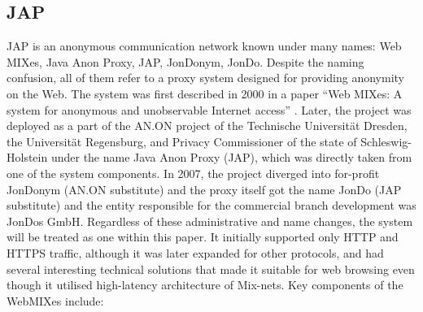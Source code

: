 \subsection{JAP}
JAP is an anonymous communication network known under many names: Web MIXes, Java Anon Proxy, JAP, JonDonym, JonDo. Despite the naming confusion, all of them refer to a proxy system designed for providing anonymity on the Web. The system was first described in 2000 in a paper “Web MIXes: A system for anonymous and unobservable Internet access” \cite{web-mixes}. Later, the project was deployed as a part of the AN.ON project of the Technische Universität Dresden, the Universität Regensburg, and Privacy Commissioner of the state of Schleswig-Holstein under the name Java Anon Proxy (JAP), which was directly taken from one of the system components. In 2007, the project diverged into for-profit JonDonym (AN.ON substitute) and the proxy itself got the name JonDo (JAP substitute) and the entity responsible for the commercial branch development was JonDos GmbH. Regardless of these administrative and name changes, the system will be treated as one within this paper. It initially supported only HTTP and HTTPS traffic, although it was later expanded for other protocols, and had several interesting technical solutions that made it suitable for web browsing even though it utilised high-latency architecture of Mix-nets.
Key components of the WebMIXes include: 
